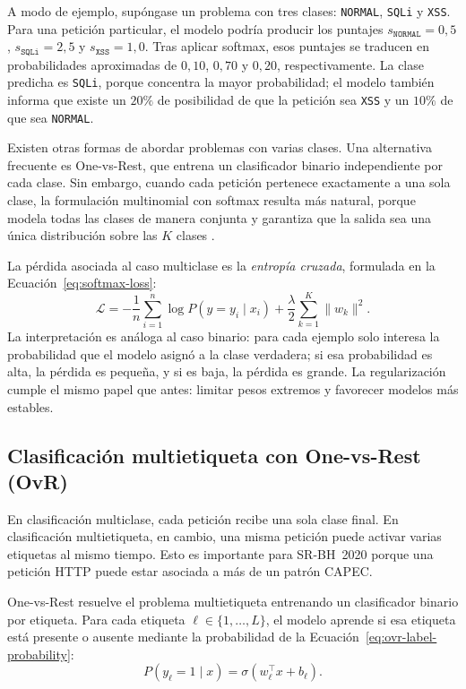 \documentclass[12pt,oneside]{report}
\begin{document}
A modo de ejemplo, supóngase un problema con tres clases: \texttt{NORMAL},
\texttt{SQLi} y \texttt{XSS}. Para una petición particular, el modelo podría
producir los puntajes $s_{\texttt{NORMAL}}=0{,}5$, $s_{\texttt{SQLi}}=2{,}5$
y $s_{\texttt{XSS}}=1{,}0$. Tras aplicar softmax, esos puntajes se traducen
en probabilidades aproximadas de $0{,}10$, $0{,}70$ y $0{,}20$,
respectivamente. La clase predicha es \texttt{SQLi}, porque concentra la
mayor probabilidad; el modelo también informa que existe un $20\%$ de
posibilidad de que la petición sea \texttt{XSS} y un $10\%$ de que sea
\texttt{NORMAL}.

Existen otras formas de abordar problemas con varias clases. Una alternativa
frecuente es One-vs-Rest, que entrena un clasificador binario independiente
por cada clase. Sin embargo, cuando cada petición pertenece exactamente a
una sola clase, la formulación multinomial con softmax resulta más natural,
porque modela todas las clases de manera conjunta y garantiza que la salida
sea una única distribución sobre las $K$ clases
\cite{sklearn_logreg,islr_logreg}.

La pérdida asociada al caso multiclase es la \textit{entropía cruzada}, formulada en la Ecuación~\eqref{eq:softmax-loss}:
\begin{equation}
\label{eq:softmax-loss}
\mathcal{L}=
-\frac{1}{n}\sum_{i=1}^{n}\log P(y=y_i\mid x_i)
+ \frac{\lambda}{2}\sum_{k=1}^{K}\lVert w_k\rVert^2.
\end{equation}
La interpretación es análoga al caso binario: para cada ejemplo solo
interesa la probabilidad que el modelo asignó a la clase verdadera; si esa
probabilidad es alta, la pérdida es pequeña, y si es baja, la pérdida es
grande. La regularización cumple el mismo papel que antes: limitar pesos
extremos y favorecer modelos más estables.

\subsection{Clasificación multietiqueta con One-vs-Rest (OvR)}

En clasificación multiclase, cada petición recibe una sola clase final. En clasificación multietiqueta, en cambio, una misma petición puede activar varias etiquetas al mismo tiempo. Esto es importante para SR-BH~2020 porque una petición HTTP puede estar asociada a más de un patrón CAPEC.

One-vs-Rest resuelve el problema multietiqueta entrenando un clasificador binario por etiqueta. Para cada etiqueta $\ell\in\{1,\dots,L\}$, el modelo aprende si esa etiqueta está presente o ausente mediante la probabilidad de la Ecuación~\eqref{eq:ovr-label-probability}:
\begin{equation}
\label{eq:ovr-label-probability}
P(y_\ell=1\mid x)=\sigma(w_\ell^\top x+b_\ell).
\end{equation}
\end{document}
